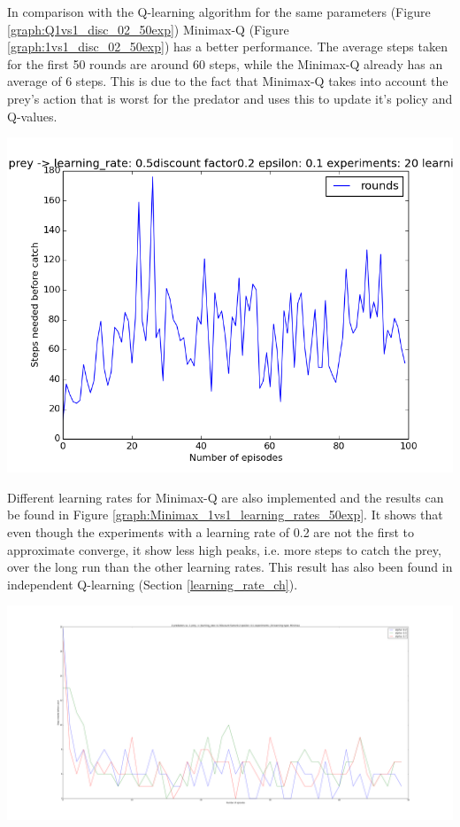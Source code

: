 In comparison with the Q-learning algorithm for the same parameters (Figure \ref{graph:Q1vs1_disc_02_50exp}) Minimax-Q (Figure  \ref{graph:1vs1_disc_02_50exp}) has a better performance. The average steps taken for the first 50 rounds are around 60 steps, while the Minimax-Q already has an average of 6 steps. This is due to the fact that Minimax-Q takes into account the prey's action that is worst for the predator and uses this to update it's policy and Q-values.

\begin{center}
	\includegraphics[scale=0.3]{qlearning_100rounds_20exp_disc02_alpha05}
	\label{graph:Q1vs1_disc_02_50exp}
\end{center}


Different learning rates for Minimax-Q are also implemented and the results can be found in Figure \ref{graph:Minimax_1vs1_learning_rates_50exp}. It shows that even though the experiments with a learning rate of 0.2 are not the first to approximate converge, it show less high peaks, i.e. more steps to catch the prey, over the long run than the other learning rates. This result has also been found in independent Q-learning (Section \ref{learning_rate_ch}).

\begin{center}
	\includegraphics[scale=0.3]{minimax_50runs_20exp_learning_rates}
	\label{graph:Minimax_1vs1_learning_rates_50exp}
\end{center}